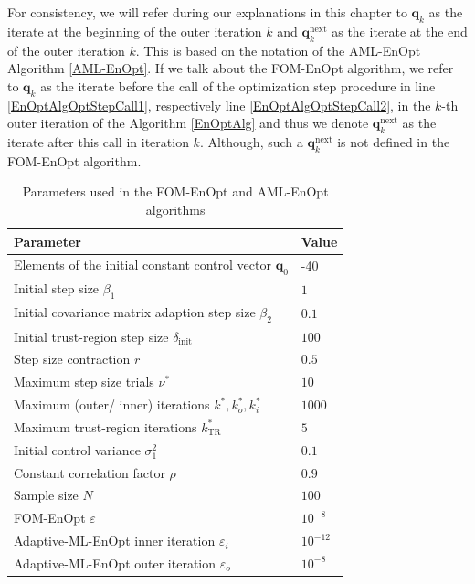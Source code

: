For consistency, we will refer during our explanations in this chapter to $\mathbf{q}_k$ as the iterate at the beginning of the outer iteration $k$ and $\mathbf{q}^\mathrm{next}_k$ as the iterate at the end of the outer iteration $k$. This is based on the notation of the AML-EnOpt Algorithm \ref{AML-EnOpt}. If we talk about the FOM-EnOpt algorithm, we refer to $\mathbf{q}_k$ as the iterate before the call of the optimization step procedure in line \ref{EnOptAlgOptStepCall1}, respectively line \ref{EnOptAlgOptStepCall2}, in the $k$-th outer iteration of the Algorithm \ref{EnOptAlg} and thus we denote $\mathbf{q}^\mathrm{next}_k$ as the iterate after this call in iteration $k$. Although, such a $\mathbf{q}^\mathrm{next}_k$ is not defined in the FOM-EnOpt algorithm.

\begin{table}
\caption{\label{FOMAMLEnOptParameters}Parameters used in the FOM-EnOpt and AML-EnOpt algorithms}
\centering
\begin{tabular}{ll}
\hline
Parameter & Value\\
\hline
Elements of the initial constant control vector $\mathbf{q}_0$ & -40\\
Initial step size $\beta_1$ & $1$\\
Initial covariance matrix adaption step size $\beta_2$ & $0.1$\\
Initial trust-region step size $\delta_\mathrm{init}$ & $100$\\
Step size contraction $r$ & $0.5$\\
Maximum step size trials $\nu^*$ & $10$\\
Maximum (outer/ inner) iterations $k^*, k^*_o, k^*_i$ & $1000$\\
Maximum trust-region iterations $k^*_\mathrm{TR}$ & $5$\\
Initial control variance $\sigma^2_1$ & $0.1$\\
Constant correlation factor $\rho$ & $0.9$\\
Sample size $N$ & $100$\\
FOM-EnOpt $\varepsilon$ & $10^{-8}$\\
Adaptive-ML-EnOpt inner iteration $\varepsilon_i$ & $10^{-12}$\\
Adaptive-ML-EnOpt outer iteration $\varepsilon_o$ & $10^{-8}$\\
\hline
\end{tabular}
\end{table}

